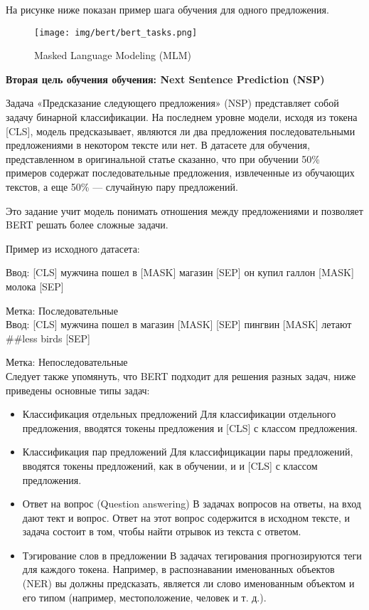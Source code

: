 \documentclass[PMI,VKR]{HSEUniversity}
\begin{document}
На рисунке ниже показан пример шага обучения для одного предложения.

\begin{figure}[h]
    \centering
    \texttt{[image: img/bert/bert\_tasks.png]}
    \caption{Masked Language Modeling (MLM)}
\end{figure}
\newpage
\begin{center}
\textbf{Вторая цель обучения обучения: Next Sentence Prediction (NSP)}    
\end{center}

Задача «Предсказание следующего предложения» (NSP) представляет собой задачу бинарной классификации. На последнем уровне модели, исходя из токена [CLS], модель предсказывает, являются ли два предложения последовательными предложениями в некотором тексте или нет. В датасете для обучения, представленном в оригинальной статье сказанно, что при обучении 50\% примеров содержат последовательные предложения, извлеченные из обучающих текстов, а еще 50\% — случайную пару предложений. 

Это задание учит модель понимать отношения между предложениями и позволяет BERT решать более сложные задачи.

\begin{center}
Пример из исходного датасета:    
\end{center}

Ввод: [CLS] мужчина пошел в [MASK] магазин [SEP] он купил галлон [MASK] молока [SEP]

Метка: Последовательные \\

Ввод: [CLS] мужчина пошел в магазин [MASK] [SEP] пингвин [MASK] летают \#\#less birds [SEP]

Метка: Непоследовательные\\

Следует также упомянуть, что BERT подходит для решения разных задач, ниже приведены основные типы задач:

\begin{itemize}
    \item Классификация отдельных предложений
    Для классификации отдельного предложения, вводятся токены предложения и [CLS] с классом предложения.
    \item Классификация пар предложений
    Для классифицикации пары предложений, вводятся токены предложений, как в обучении, и и [CLS] с классом предложения.
    \item Ответ на вопрос (Question answering)
    В задачах вопросов на ответы, на вход дают тект и вопрос. Ответ на этот вопрос содержится в исходном тексте, и задача состоит в том, чтобы найти отрывок из текста с ответом.
    \item Тэгирование слов в предложении
    В задачах тегирования прогнозируются теги для каждого токена. Например, в распознавании именованных объектов (NER) вы должны предсказать, является ли слово именованным объектом и его типом (например, местоположение, человек и т. д.).
\end{itemize}
\end{document}
